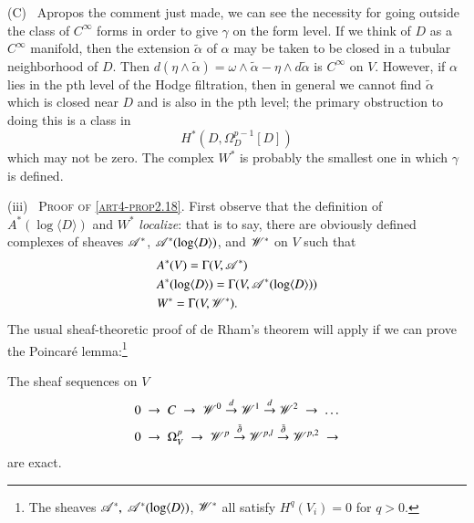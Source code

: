 \medskip
\noindent
(C)~ Apropos the comment just made, we can see the necessity for going outside the class of $C^\infty$ forms in order to give $\gamma$ on the form level. If we think of $D$ as a $C^\infty$ manifold, then the extension $\tilde{\alpha}$ of $\alpha$ may be taken to be closed in a tubular neighborhood of $D$. Then $d (\eta \wedge \tilde{\alpha}) = \omega \wedge \tilde{\alpha} - \eta \wedge d \tilde{\alpha}$ is $C^\infty$ on $V$. However, if $\alpha$ lies in the pth level of the Hodge filtration, then in general we cannot find $\tilde{\alpha}$ which is closed near $D$ and is also in the pth level; the primary obstruction to doing this is a class in 
$$
H^\ast (D, \Omega^{p-1}_D [D])
$$
which may not be zero. The complex $W^\ast$ is probably the smallest one in which $\gamma$ is defined.

\medskip
\noindent
(iii)~ \textsc{Proof of \eqref{art4-prop2.18}}. First observe that the definition of $A^\ast (\log \langle D \rangle)$ and $W^\ast$ \textit{localize}: that is to say, there are obviously defined complexes of sheaves $\mathscr{A}^\ast$, $\mathscr{A}^\ast (\log \langle D \rangle)$, and $\mathscr{W}^\ast$ on $V$ such that
\begin{align*}
& A^\ast (V) = \Gamma (V, \mathscr{A}^\ast)\\
& A^\ast (\log \langle D \rangle) = \Gamma (V, \mathscr{A}^\ast (\log \langle D \rangle))\\
& W^\ast = \Gamma (V, \mathscr{W}^\ast).
\end{align*}
The usual sheaf-theoretic proof of de Rham's theorem will apply if we can prove the Poincar\'e lemma:\footnote[6]{The sheaves $\mathscr{A}^\ast, \; \mathscr{A}^\ast(\log \langle D \rangle)$, $\mathscr{W}^\ast$ all satisfy $H^q (V_i) =0$ for $q > 0$.}
 
\setcounter{lemma}{19}
\begin{lemma}\label{art4-lem2.20}
The sheaf sequences on $V$
\begin{align*}
& 0 \;  \to  \; C \; \to \; \mathscr{W}^0 \; {\displaystyle{\mathop{\rightarrow}^d}} \; \mathscr{W}^1 \; {\displaystyle{\mathop{\rightarrow}^d}} \; \mathscr{W}^2  \; \to  \; \ldots \\
& 0 \; \to \; \Omega^p_V \; \to \; \mathscr{W}^p \; {\displaystyle{\mathop{\rightarrow}^{\bar{\partial}}}} \; \mathscr{W}^{p,l} \; {\displaystyle{\mathop{\rightarrow}^{\bar{\partial}}}} \; \mathscr{W}^{p,2} \; \to 
\end{align*}
are exact.
\end{lemma}

